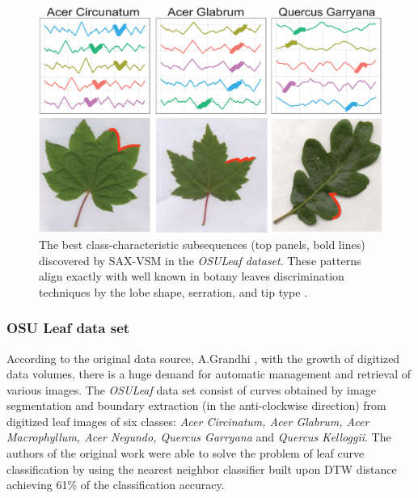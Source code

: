 \begin{figure}[!h]
   \centering
   \includegraphics[width=130mm]{figures/AcerCircunatum.eps}
   \caption[The best class-characteristic subsequences (top panels, bold lines) discovered by SAX-VSM in
    the \textit{OSULeaf dataset}.]{The best class-characteristic subsequences (top panels, bold lines) discovered by SAX-VSM in
    the \textit{OSULeaf dataset}. These patterns align exactly with well known in botany leaves discrimination techniques
    by the lobe shape, serration, and tip type \cite{citeulike:12134192}.}
   \label{fig:shapelet-acer-patterns}
\end{figure}

\subsubsection{OSU Leaf data set}
According to the original data source, A.Grandhi \cite{citeulike:12563798}, with the growth of digitized data 
volumes, there is a huge demand for automatic management and retrieval of various images. 
The \textit{OSULeaf} data set consist of curves obtained by image segmentation and boundary
extraction (in the anti-clockwise direction) from digitized leaf images of six classes: \textit{Acer Circinatum, 
Acer Glabrum, Acer Macrophyllum, Acer Negundo, Quercus Garryana} and \textit{Quercus Kelloggii}.
The authors of the original work were able to solve the problem of leaf curve classification by using 
the nearest neighbor classifier built upon DTW distance achieving 61\% of the classification accuracy. 

